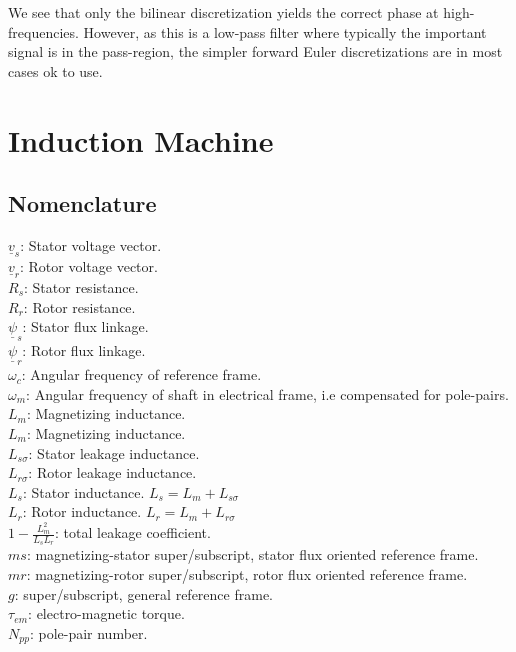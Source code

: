 \documentclass[]{book}
\begin{document}
We see that only the bilinear discretization yields the correct phase at high-frequencies. However, as this is a low-pass filter where typically the important signal is in the pass-region, the simpler forward Euler discretizations are in most cases ok to use.

\hypertarget{induction-machine}{%
\chapter{Induction Machine}\label{induction-machine}}

\hypertarget{nomenclature-1}{%
\section{Nomenclature}\label{nomenclature-1}}

\(\underline{v}_s\): Stator voltage vector.\\
\(\underline{v}_r\): Rotor voltage vector.\\
\(R_s\): Stator resistance.\\
\(R_r\): Rotor resistance.\\
\(\underline{\psi}_s\): Stator flux linkage.\\
\(\underline{\psi}_r\): Rotor flux linkage.\\
\(\omega_c\): Angular frequency of reference frame.\\
\(\omega_m\): Angular frequency of shaft in electrical frame, i.e compensated for pole-pairs.\\
\(L_m\): Magnetizing inductance.\\
\(L_m\): Magnetizing inductance.\\
\(L_{s\sigma}\): Stator leakage inductance.\\
\(L_{r\sigma}\): Rotor leakage inductance.\\
\(L_s\): Stator inductance. \(L_s = L_m + L_{s\sigma}\)\\
\(L_r\): Rotor inductance. \(L_r = L_m + L_{r\sigma}\)\\
\(1-\frac{L^2_m}{L_sL_r}\): total leakage coefficient.\\
\(ms\): magnetizing-stator super/subscript, stator flux oriented reference frame.\\
\(mr\): magnetizing-rotor super/subscript, rotor flux oriented reference frame.\\
\(g\): super/subscript, general reference frame.\\
\(\tau_{em}\): electro-magnetic torque.\\
\(N_{pp}\): pole-pair number.\\
\end{document}

